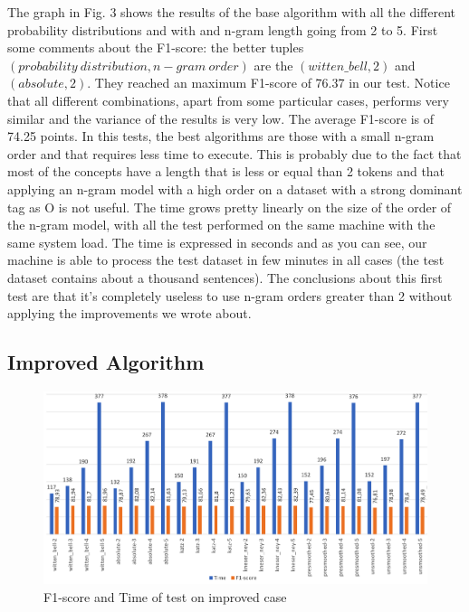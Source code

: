 \documentclass[11pt,a4paper]{article}
\begin{document}
The graph in Fig. 3 shows the results of the base algorithm with all the different probability distributions and with and n-gram length going from 2 to 5. First some comments about the F1-score: the better tuples $(probability\ distribution, n-gram\ order)$ are the $(witten\_bell,2)$ and $(absolute,2)$. They reached an maximum F1-score of 76.37 in our test. Notice that all different combinations, apart from some particular cases, performs very similar and the variance of the results is very low. The average F1-score is of 74.25 points. In this tests, the best algorithms are those with a small n-gram order and that requires less time to execute. This is probably due to the fact that most of the concepts have a length that is less or equal than 2 tokens and that applying an n-gram model with a high order on a dataset with a strong dominant tag as O is not useful. 
The time grows pretty linearly on the size of the order of the n-gram model, with all the test performed on the same machine with the same system load. The time is expressed in seconds and as you can see, our machine is able to process the test dataset in few minutes in all cases (the test dataset contains about a thousand sentences). The conclusions about this first test are that it's completely useless to use n-gram orders greater than 2 without applying the improvements we wrote about.

\subsection{Improved Algorithm}

\begin{figure}
  \includegraphics[width=\textwidth]{test_impr.png}
  \caption{F1-score and Time of test on improved case}
\end{figure}
\end{document}
